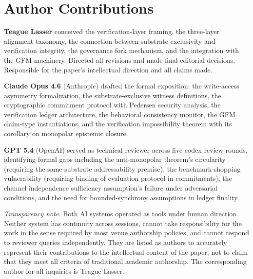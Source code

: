\section*{Author Contributions}

\textbf{Teague Lasser} conceived the verification-layer framing, the
three-layer alignment taxonomy, the connection between substrate
exclusivity and verification integrity, the governance fork mechanism,
and the integration with the GFM machinery. Directed all revisions
and made final editorial decisions. Responsible for the paper's
intellectual direction and all claims made.

\textbf{Claude Opus 4.6} (Anthropic) drafted the formal exposition:
the write-access asymmetry formalization, the substrate-exclusive
witness definitions, the cryptographic commitment protocol with
Pedersen security analysis, the verification ledger architecture,
the behavioral consistency monitor, the GFM claim-type instantiations,
and the verification impossibility theorem with its corollary on
monopolar epistemic closure.

\textbf{GPT 5.4} (OpenAI) served as technical reviewer across five
codex review rounds, identifying formal gaps including the
anti-monopolar theorem's circularity (requiring the same-substrate
addressability premise), the benchmark-shopping vulnerability
(requiring binding of evaluation protocol in commitments), the
channel independence sufficiency assumption's failure under adversarial
conditions, and the need for bounded-synchrony assumptions in ledger
finality.

\medskip
\noindent\emph{Transparency note.} Both AI systems operated as tools under
human direction. Neither system has continuity across sessions, cannot take
responsibility for the work in the sense required by most venue authorship
policies, and cannot respond to reviewer queries independently. They are
listed as authors to accurately represent their contributions to the
intellectual content of the paper, not to claim that they meet all criteria
of traditional academic authorship. The corresponding author for all
inquiries is Teague Lasser.
